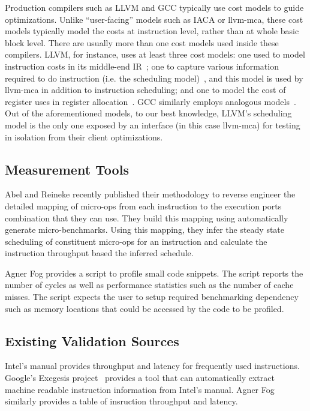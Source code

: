 Production compilers such as LLVM\cite{llvm} and GCC typically use cost models 
to guide optimizations.
Unlike ``user-facing'' models such as IACA or llvm-mca, these cost models typically
model the costs at instruction level, rather than at whole basic block level.
There are usually more than one cost models used inside these compilers.
LLVM, for instance, uses at least three cost models: 
one used to model instruction costs in its middle-end IR~\cite{llvm-cost};
one to capture various information required to do instruction 
(i.e. the scheduling model)~\cite{llvm-sched}, and this model is used by llvm-mca in addition
to instruction scheduling;
and one to model the cost of register uses in register allocation~\cite{llvm-reg}.
GCC similarly employs analogous models~\cite{gcc-cost,gcc-sched}.
Out of the aforementioned models, to our best knowledge, 
LLVM's scheduling model is the only one exposed by an interface
(in this case llvm-mca) for testing in isolation from their client optimizations.

\subsection{Measurement Tools}
Abel and Reineke\cite{uops} recently published their methodology
to reverse engineer the detailed mapping of micro-ops
from each instruction to the execution ports combination
that they can use.
They build this mapping using automatically generate micro-benchmarks.
Using this mapping, they infer the steady state scheduling of constituent
micro-ops for an instruction and calculate the instruction throughput based
the inferred schedule.

Agner Fog\cite{agner} provides a script to profile small code snippets.
The script reports the number of cycles as well as performance statistics such as 
the number of cache misses.
The script expects the user to setup required benchmarking dependency such as 
memory locations that could be accessed by the code to be profiled.

\subsection{Existing Validation Sources}
Intel's manual\cite{intel-manual} provides throughput and latency for frequently used instructions.
Google's Exegesis project~\cite{exegesis} provides a tool that can automatically extract
machine readable instruction information from Intel's manual.
Agner Fog\cite{agner} similarly provides a table of insruction throughput and latency.

